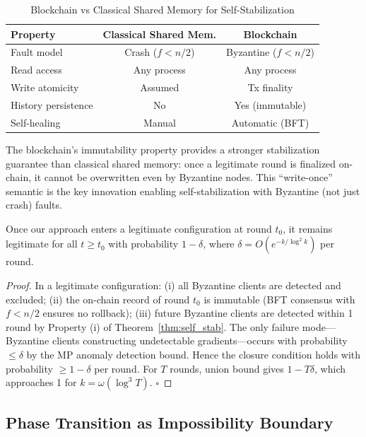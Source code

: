 \documentclass[runningheads]{llncs}
\begin{document}
\begin{table}[htbp]
\centering
\caption{Blockchain vs Classical Shared Memory for Self-Stabilization}
\label{tab:blockchain_vs_shmem}
\begin{tabular}{|l|c|c|}
\hline
\textbf{Property} & \textbf{Classical Shared Mem.} & \textbf{Blockchain} \\
\hline
Fault model & Crash ($f < n/2$) & Byzantine ($f < n/2$) \\
Read access & Any process & Any process \\
Write atomicity & Assumed & Tx finality \\
History persistence & No & Yes (immutable) \\
Self-healing & Manual & Automatic (BFT) \\
\hline
\end{tabular}
\end{table}

The blockchain's immutability property provides a stronger stabilization guarantee than classical shared memory: once a legitimate round is finalized on-chain, it cannot be overwritten even by Byzantine nodes. This ``write-once'' semantic is the key innovation enabling self-stabilization with Byzantine (not just crash) faults.

\begin{lemma}
\label{lem:closure}
Once our approach enters a legitimate configuration at round $t_0$, it remains legitimate for all $t \geq t_0$ with probability $1 - \delta$, where $\delta = O(e^{-k/\log^2 k})$ per round.
\end{lemma}

\begin{proof}
In a legitimate configuration: (i) all Byzantine clients are detected and excluded; (ii) the on-chain record of round $t_0$ is immutable (BFT consensus with $f < n/2$ ensures no rollback); (iii) future Byzantine clients are detected within 1 round by Property (i) of Theorem~\ref{thm:self_stab}. The only failure mode---Byzantine clients constructing undetectable gradients---occurs with probability $\leq \delta$ by the MP anomaly detection bound. Hence the closure condition holds with probability $\geq 1 - \delta$ per round. For $T$ rounds, union bound gives $1 - T\delta$, which approaches 1 for $k = \omega(\log^3 T)$. \hfill$\square$
\end{proof}

\subsection{Phase Transition as Impossibility Boundary}
\end{document}
